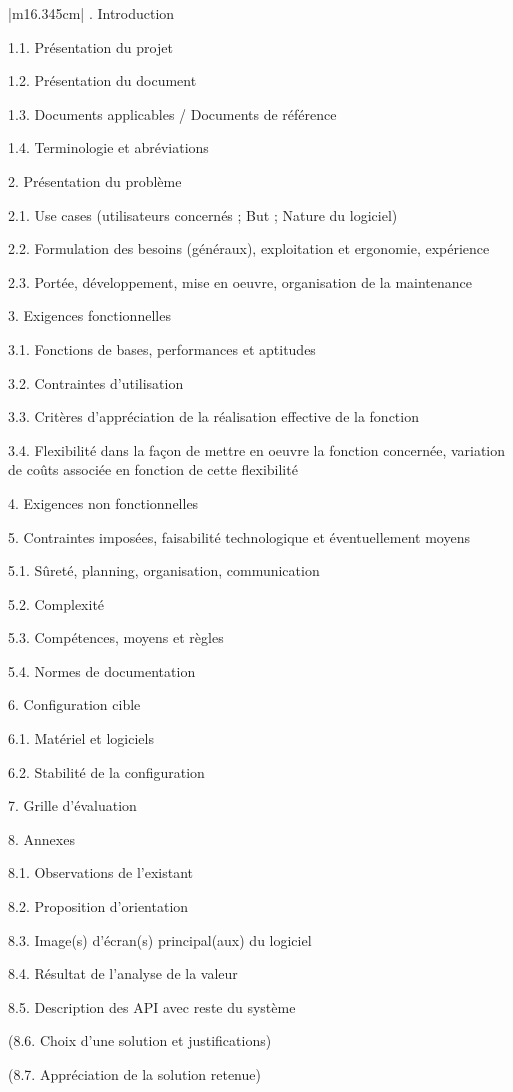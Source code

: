 \documentclass{mise_en_page}
\begin{document}
\begin{flushleft}
\tablehead{}
\begin{supertabular}{|m{16.345cm}|}
. Introduction

1.1. Présentation du projet

1.2. Présentation du document

1.3. Documents applicables / Documents de référence

1.4. Terminologie et abréviations

2. Présentation du problème

2.1. Use cases (utilisateurs concernés ; But ; Nature du logiciel)

2.2. Formulation des besoins (généraux), exploitation et ergonomie,
expérience

2.3. Portée, développement, mise en oeuvre, organisation de la
maintenance

3. Exigences fonctionnelles

3.1. Fonctions de bases, performances et aptitudes

3.2. Contraintes d’utilisation

3.3. Critères d’appréciation de la réalisation effective de la fonction

3.4. Flexibilité dans la façon de mettre en oeuvre la fonction
concernée, variation de coûts associée en fonction de cette flexibilité

4. Exigences non fonctionnelles

5. Contraintes imposées, faisabilité technologique et éventuellement
moyens

5.1. Sûreté, planning, organisation, communication

5.2. Complexité

5.3. Compétences, moyens et règles

5.4. Normes de documentation

6. Configuration cible

6.1. Matériel et logiciels

6.2. Stabilité de la configuration

7. Grille d’évaluation

8. Annexes

8.1. Observations de l’existant

8.2. Proposition d’orientation

8.3. Image(s) d’écran(s) principal(aux) du logiciel

8.4. Résultat de l’analyse de la valeur

8.5. Description des API avec reste du système

(8.6. Choix d’une solution et justifications)

(8.7. Appréciation de la solution retenue)\\\hline
\end{supertabular}
\end{flushleft}
\end{document}
